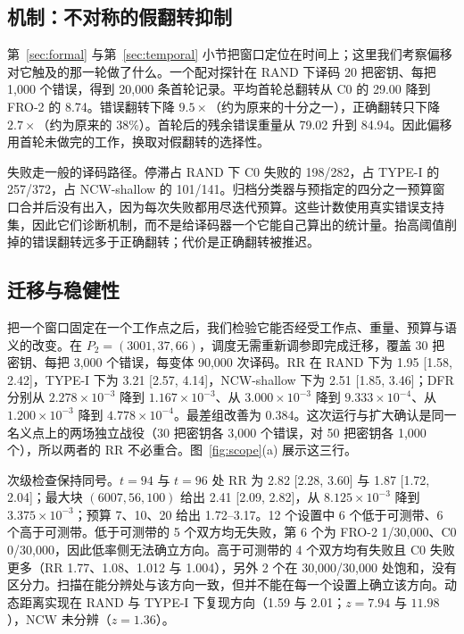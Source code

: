 \subsection{机制：不对称的假翻转抑制}\label{sec:mechanism}

第~\ref{sec:formal} 与第~\ref{sec:temporal} 小节把窗口定位在时间上；这里我们考察偏移对它触及的那一轮做了什么。一个配对探针在 RAND 下译码 20 把密钥、每把 1{,}000 个错误，得到 20{,}000 条首轮记录。平均首轮总翻转从 C0 的 29.00 降到 FRO-2 的 8.74。错误翻转下降 $9.5\times$（约为原来的十分之一），正确翻转只下降 $2.7\times$（约为原来的 38\%）。首轮后的残余错误重量从 79.02 升到 84.94。因此偏移用首轮未做完的工作，换取对假翻转的选择性。

失败走一般的译码路径。停滞占 RAND 下 C0 失败的 198/282，占 TYPE-I 的 257/372，占 NCW-shallow 的 101/141。归档分类器与预指定的四分之一预算窗口合并后没有出入，因为每次失败都用尽迭代预算。这些计数使用真实错误支持集，因此它们诊断机制，而不是给译码器一个它能自己算出的统计量。抬高阈值削掉的错误翻转远多于正确翻转；代价是正确翻转被推迟。


\subsection{迁移与稳健性}\label{sec:transfer}

把一个窗口固定在一个工作点之后，我们检验它能否经受工作点、重量、预算与语义的改变。在 $P_2=(3001,37,66)$，调度无需重新调参即完成迁移，覆盖 30 把密钥、每把 3{,}000 个错误，每变体 90{,}000 次译码。RR 在 RAND 下为 1.95 [1.58, 2.42]，TYPE-I 下为 3.21 [2.57, 4.14]，NCW-shallow 下为 2.51 [1.85, 3.46]；DFR 分别从 $2.278\times10^{-3}$ 降到 $1.167\times10^{-3}$、从 $3.000\times10^{-3}$ 降到 $9.333\times10^{-4}$、从 $1.200\times10^{-3}$ 降到 $4.778\times10^{-4}$。最差组改善为 0.384。这次运行与扩大确认是同一名义点上的两场独立战役（30 把密钥各 3{,}000 个错误，对 50 把密钥各 1{,}000 个），所以两者的 RR 不必重合。图~\ref{fig:scope}(a) 展示这三行。

次级检查保持同号。$t=94$ 与 $t=96$ 处 RR 为 2.82 [2.28, 3.60] 与 1.87 [1.72, 2.04]；最大块 $(6007,56,100)$ 给出 2.41 [2.09, 2.82]，从 $8.125\times10^{-3}$ 降到 $3.375\times10^{-3}$；预算 7、10、20 给出 1.72--3.17。12 个设置中 6 个低于可测带、6 个高于可测带。低于可测带的 5 个双方均无失败，第 6 个为 FRO-2 1/30{,}000、C0 0/30{,}000，因此低率侧无法确立方向。高于可测带的 4 个双方均有失败且 C0 失败更多（RR 1.77、1.08、1.012 与 1.004），另外 2 个在 30{,}000/30{,}000 处饱和，没有区分力。扫描在能分辨处与该方向一致，但并不能在每一个设置上确立该方向。动态距离实现在 RAND 与 TYPE-I 下复现方向（1.59 与 2.01；$z=7.94$ 与 $11.98$），NCW 未分辨（$z=1.36$）。

